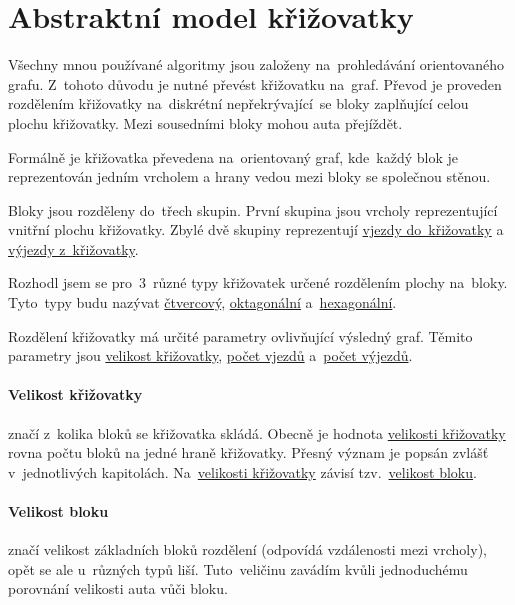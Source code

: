 \section{Abstraktní model křižovatky}\label{sec:krizovatka}

%


Všechny mnou používané algoritmy jsou založeny na~prohledávání orientovaného grafu.
Z~tohoto důvodu je nutné převést křižovatku na~graf.
Převod je proveden rozdělením křižovatky na~diskrétní nepřekrývající~se bloky zaplňující celou plochu křižovatky.
Mezi sousedními bloky mohou auta přejíždět.

Formálně je křižovatka převedena na~orientovaný graf,
kde~každý blok je reprezentován jedním vrcholem a hrany vedou mezi bloky se společnou stěnou.

Bloky jsou rozděleny do~třech skupin.
První skupina jsou vrcholy reprezentující vnitřní plochu křižovatky.
Zbylé dvě skupiny reprezentují \hyperref[par:vjezdy]{vjezdy do~křižovatky} a \hyperref[par:vyjezdy]{výjezdy z~křižovatky}.

Rozhodl jsem se pro~$3$~různé typy křižovatek určené rozdělením plochy na~bloky.
Tyto~typy budu nazývat \hyperref[subsec:ctvercovy_typ]{čtvercový}, \hyperref[subsec:oktagonalni_typ]{oktagonální}
a~\hyperref[subsec:hexagonalni_typ]{hexagonální}.

Rozdělení křižovatky má určité parametry ovlivňující výsledný graf.
Těmito parametry jsou \hyperref[par:velikost_krizovatky]{velikost křižovatky},
\hyperref[par:vjezdy]{počet vjezdů} a~\hyperref[par:vyjezdy]{počet výjezdů}.

\paragraph{Velikost křižovatky}\label{par:velikost_krizovatky} značí z~kolika bloků se křižovatka skládá.
Obecně je hodnota \hyperref[par:velikost_krizovatky]{velikosti křižovatky} rovna počtu bloků na jedné hraně křižovatky.
Přesný význam je popsán zvlášť v~jednotlivých kapitolách.
Na~\hyperref[par:velikost_krizovatky]{velikosti křižovatky} závisí tzv.~\hyperref[par:velikost_bloku]{velikost bloku}.

\paragraph{Velikost bloku}\label{par:velikost_bloku} značí velikost základních bloků rozdělení
(odpovídá vzdálenosti mezi vrcholy), opět se ale u~různých typů liší.
Tuto~veličinu zavádím kvůli jednoduchému porovnání velikosti auta vůči bloku.

